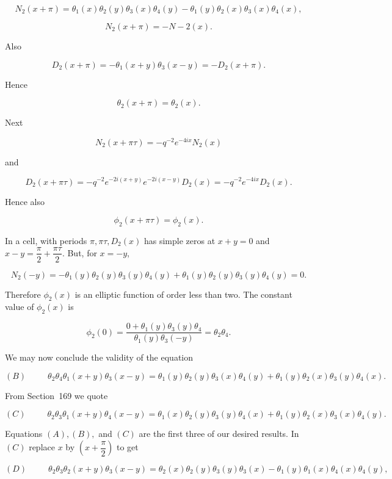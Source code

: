 \begin{solution}
$$N_2(x+\pi) = \theta_1(x) \theta_2(y) \theta_3(x) \theta_4(y) - \theta_1(y) \theta_2(x) \theta_3(x) \theta_4(x),$$

$$N_2(x+\pi) = -N-2(x).$$

Also

$$D_2(x+\pi) = -\theta_1(x+y) \theta_3(x-y) = -D_2(x+\pi).$$

Hence

$$\theta_2(x+\pi) = \theta_2(x).$$

Next

$$N_2(x+\pi \tau) = -q^{-2} e^{-4ix} N_2(x)$$

and

$$D_2(x+ \pi \tau) = -q^{-2} e^{-2i(x+y)} e^{-2i(x-y)} D_2(x) = -q^{-2} e^{-4ix} D_2(x).$$

Hence also

$$\phi_2(x+\pi \tau) = \phi_2(x).$$

In a cell, with periods $\pi, \pi \tau, D_2(x)$ has simple zeros at $x+y=0$ and $x-y = \dfrac{\pi}{2} + \dfrac{\pi \tau}{2}$. But, for $x= -y$,

$$N_2(-y) = -\theta_1(y) \theta_2(y) \theta_3(y) \theta_4(y) + \theta_1(y) \theta_2(y) \theta_3(y) \theta_4(y)=0.$$

Therefore $\phi_2(x)$ is an elliptic function of order less than two. The constant value of $\phi_2(x)$ is

$$\phi_2(0) = \dfrac{0 + \theta_1(y)\theta_3(y)\theta_4}{\theta_1(y) \theta_3(-y)} = \theta_2 \theta_4.$$

We may now conclude the validity of the equation

$$(B) \hspace{30pt} \theta_2 \theta_4 \theta_1(x+y) \theta_3(x-y) = \theta_1(y) \theta_2(y) \theta_3(x) \theta_4(y) + \theta_1(y) \theta_2(x) \theta_3(y) \theta_4(x).$$

From Section~169 we quote

$$(C) \hspace{30pt} \theta_2\theta_3\theta_1(x+y)\theta_4(x-y) = \theta_1(x) \theta_2(y) \theta_3(y) \theta_4(x) + \theta_1(y) \theta_2(x) \theta_3(x) \theta_4(y).$$

Equations $(A), (B),$ and $(C)$ are the first three of our desired results. In $(C)$ replace $x$ by $\left( x + \dfrac{\pi}{2} \right)$ to get

$$(D) \hspace{30pt} \theta_2 \theta_3 \theta_2(x+y) \theta_3(x-y) = \theta_2(x) \theta_2(y) \theta_3(y) \theta_3(x) - \theta_1(y) \theta_1(x) \theta_4(x) \theta_4(y),$$


\end{solution}
